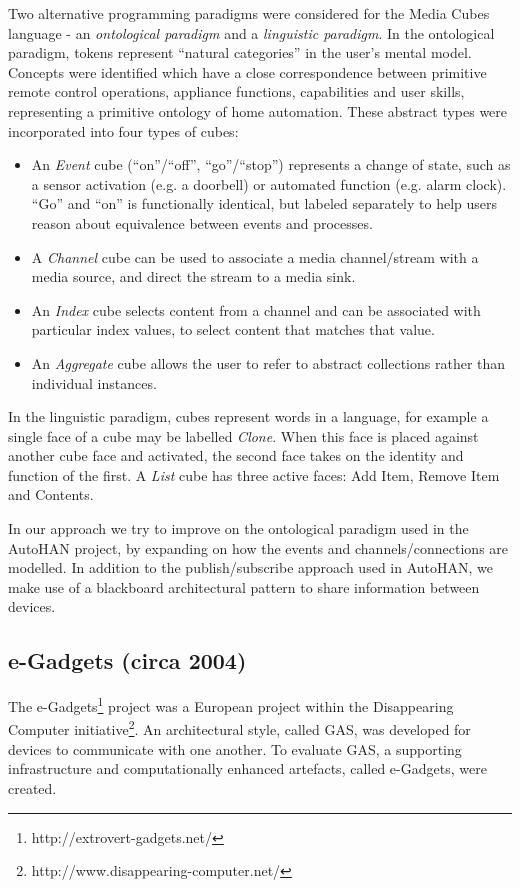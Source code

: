 Two alternative programming paradigms were considered for the Media Cubes language - an \emph{ontological paradigm} and a \emph{linguistic paradigm}. In the ontological paradigm, tokens represent ``natural categories'' in the user's mental model. Concepts were identified which have a close correspondence between primitive remote control operations, appliance functions, capabilities and user skills, representing a primitive ontology of home automation. These abstract types were incorporated into four types of  cubes:

\begin{itemize}
	\item An \emph{Event} cube (``on''/``off'', ``go''/``stop'') represents a change of state, such as a sensor activation (e.g. a doorbell) or automated function (e.g. alarm clock). ``Go'' and ``on'' is functionally identical, but labeled separately to help users reason about equivalence between events and processes.
	\item A \emph{Channel} cube can be used to associate a media channel/stream with a media source, and direct the stream to a media sink.
	\item An \emph{Index} cube selects content from a channel and can be associated with particular index values, to select content that matches that value. 
	\item An \emph{Aggregate} cube allows the user to refer to abstract collections rather than individual instances.
\end{itemize}

In the linguistic paradigm, cubes represent words in a language, for example a single face of a cube may be labelled \emph{Clone}. When this face is placed against another cube face and activated, the second face takes on the identity and function of the first. A \emph{List} cube has three active faces: Add Item, Remove Item and Contents.

In our approach we try to improve on the ontological paradigm used in the AutoHAN project, by expanding on how the events and channels/connections are modelled. In addition to the publish/subscribe approach used in AutoHAN, we make use of a blackboard architectural pattern to share information between devices. 


\subsection{e-Gadgets (circa 2004)}
\label{egadgets}

The e-Gadgets\footnote{http://extrovert-gadgets.net/} project was a European project within the Disappearing Computer initiative\footnote{http://www.disappearing-computer.net/}. An architectural style, called \ac{GAS}, was developed for devices to communicate with one another. To evaluate \ac{GAS}, a supporting infrastructure and computationally enhanced artefacts, called e-Gadgets, were created.

